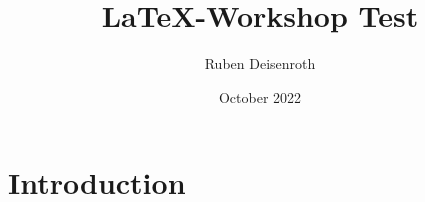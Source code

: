\documentclass{article}
\title{LaTeX-Workshop Test}
\author{Ruben Deisenroth}
\date{October 2022}
\begin{document}
\maketitle

\section{Introduction}
\end{document}
